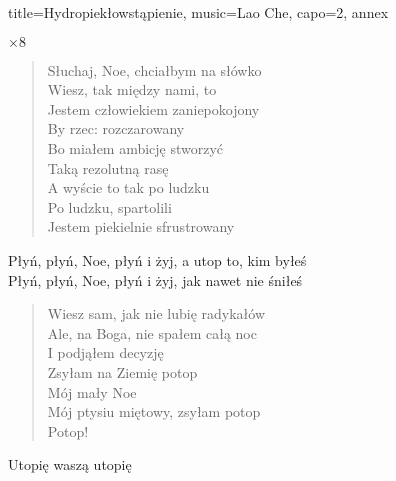 \newpage
\begin{song}{title={Hydropiekłowstąpienie}, music={Lao Che}, capo=2, annex}
\small
    \begin{intro}
           
    \end{intro}
    \begin{riff}
            $\times 8$
    \end{riff}
    \begin{multicols}{2}
    \begin{verse}
        Słuchaj, Noe, chciałbym na słówko \smallskip \\
        Wiesz, tak między nami, to \\
        Jestem człowiekiem zaniepokojony \\
        By rzec: rozczarowany \smallskip \\
        Bo miałem ambicję stworzyć \\
        Taką rezolutną rasę \smallskip \\
        A wyście to tak po ludzku \\
        Po ludzku, spartolili \smallskip \\
        Jestem piekielnie sfrustrowany
    \end{verse}
    \begin{interlude}
        Płyń, płyń, Noe, płyń i żyj, a utop to, kim byłeś \\
        Płyń, płyń, Noe, płyń i żyj, jak nawet nie śniłeś
    \end{interlude}
    \begin{verse}
        Wiesz sam, jak nie lubię radykałów \smallskip \\
        Ale, na Boga, nie spałem całą noc \\
        I podjąłem decyzję \smallskip \\
        Zsyłam na Ziemię potop \\
        Mój mały Noe \smallskip \\
        Mój ptysiu miętowy, zsyłam potop \\
        Potop!
    \end{verse}
    \begin{riff}
           
    \end{riff}
    \begin{chorus}
        Utopię waszą utopię \\

\end{chorus}
\end{multicols}
\end{song}
